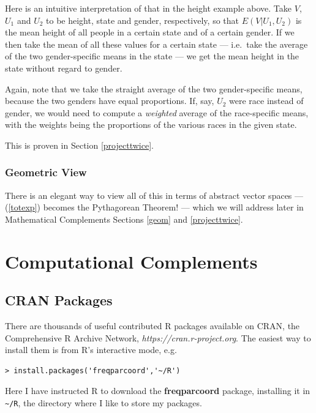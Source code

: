 Here is an intuitive interpretation of that in the height example above.
Take $V$, $U_1$ and $U_2$ to be height, state and gender, respectively,
so that $E(V | U_1, U_2)$ is the mean height of all people in a certain
state and of a certain gender.  If we then take the mean of all these
values for a certain state --- i.e.\ take the average of the two
gender-specific means in the state --- we get the mean height in the
state without regard to gender.

Again, note that we take the straight average of the two gender-specific
means, because the two genders have equal proportions.  If, say, $U_2$
were race instead of gender, we would need to compute a {\it weighted}
average of the race-specific means, with the weights being the
proportions of the various races in the given state.

This is proven in Section \ref{projecttwice}.

\subsubsection{Geometric View}
\label{geomview}

There is an elegant way to view all of this in terms of abstract vector
spaces --- (\ref{totexp}) becomes the Pythagorean Theorem! ---
which we will address later in Mathematical Complements
Sections \ref{geom} and \ref{projecttwice}.

\section{Computational Complements}

\subsection{CRAN Packages}
\label{cranpkgs}

There are thousands of useful contributed R packages available on
CRAN, the Comprehensive R Archive Network,
\textit{https://cran.r-project.org}.  The easiest way to install them is
from R's interactive mode, e.g.

\begin{lstlisting}
> install.packages('freqparcoord','~/R')
\end{lstlisting}

Here I have instructed R to download the {\bf freqparcoord}
package, installing it in \lstinline{~/R}, the directory where I like to
store my packages.  

